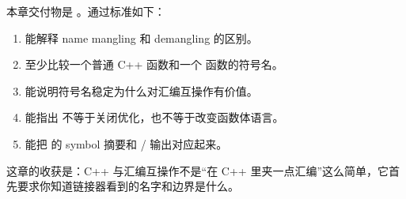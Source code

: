 
本章交付物是 。通过标准如下：

\begin{enumerate}
  \item 能解释 name mangling 和 demangling 的区别。
  \item 至少比较一个普通 C++ 函数和一个  函数的符号名。
  \item 能说明符号名稳定为什么对汇编互操作有价值。
  \item 能指出  不等于关闭优化，也不等于改变函数体语言。
  \item 能把  的 symbol 摘要和 / 输出对应起来。
\end{enumerate}

这章的收获是：C++ 与汇编互操作不是“在 C++ 里夹一点汇编”这么简单，它首先要求你知道链接器看到的名字和边界是什么。
